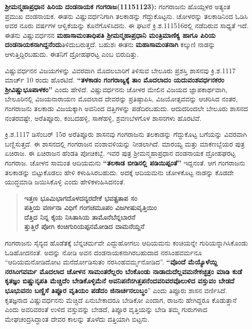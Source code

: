 \textbf{ಶ‍್ರೀಮನ್ಮಹಾಪ್ರಧಾನ ಹಿರಿಯ ದಂಡನಾಯಕ ಗಂಗರಾಜ(1115\general{\enginline{-}}1123):} ಗಂಗರಾಜನು ಹೊಯ್ಸಳರ ಅತ್ಯಂತ ಪ್ರಮುಖ ದಂಡನಾಯಕ. ಈತನು ವಿಷ್ಣುವರ್ಧನಿಗಾಗಿ ತಲಕಾಡನ್ನು ಗೆದ್ದುಕೊಟ್ಟನು. ಚೋಳರನ್ನು ತಲಕಾಡಿನಿಂದ ಓಡಿಸಿ ಅವರ ನೂರು ವರ್ಷಗಳ ಆಳ್ವಿಕೆಯನ್ನು ಕೊನೆಗೊಳಿಸಿದನು. ಈ ಘಟನೆ ಕ್ರಿ.ಶ.1115\enginline{-}16ರಲ್ಲಿ ನಡೆದಿರುವ ಸಾಧ್ಯತೆ ಇದೆ. ಈತನು ವಿಷ್ಣುವರ್ಧನನ \textbf{ಮಹಾಸಾಮಂತಾಧಿಪತಿ ಶ‍್ರೀಮನ್ಮಹಾಪ್ರಧಾನಿ ಮಂತ್ರಿಮಾಣಿಕ್ಯ ಹಾಗೂ ಪಿರಿಯ ದಂಡನಾಯಕನಾಗಿದ್ದನೆಂದು}ತಿಳಿದುಬರುತ್ತದೆ. ಬಹುಶಃ ಈತನು \textbf{ಮಹಾಸಾಮಂತನಾಗಿ} ಕಲ್ಕುಣಿ ನಾಡನ್ನು ಆಳುತ್ತಿದ್ದಿರ\-ಬಹುದು. ಈತನಿಗೆ ದ್ರೋಹಘರಟ್ಟ ಎಂಬ ಬಿರುದಿತ್ತು.

ವಿಷ್ಣುವರ್ಧನನ ವಿಜಯಗಳನ್ನು ವಿವರವಾಗಿ ಮೊದಲಬಾರಿಗೆ ತಿಳಿಸುವ ಬೇಲೂರು ಪ್ರಶಸ್ತಿ ಶಾಸನವು ಕ್ರಿ.ಶ.1117 ಮಾರ್ಚ್ 10 ರಂದು ಹೊರಟಿದೆ. \textbf{“ತಳಕಾಡಂ ಗಂಗರಾಜ್ಯಕ್ಕೆ ತಾಂ ಮೊದಲಾದಂ ಯದುವಂಶವರ್ಧನಕರಂ ಶ‍್ರೀವಿಷ್ಣು\-ಭೂಪಾಳಕಂ” }ಎಂದು ಹೇಳಿದೆ. ವಿಷ್ಣುವರ್ಧನನು ಚೋಳರ ಮೇಲಿನ ವಿಜಯದ ಜ್ಞಾಪಕಾರ್ಥವಾಗಿ, ಬೇಲೂರಿನಲ್ಲಿ ವಿಜಯನಾರಾಯಣ ಮೊದಲಾದ ದೇವರನ್ನು ಪ್ರತಿಷ್ಠಾಪಿಸಿ, ವಿಜಯೋತ್ಸವವನ್ನು ಆಚರಿಸಿದ ನಂತರ, ಗಂಗರಾಜನು ತಲಕಾಡು ವಿಜಯಕ್ಕಾಗಿ ಅವನಿಂದ ದತ್ತಿಗಳನ್ನು ಪಡೆದಿರಬಹುದು. ಆದುದರಿಂದಲೇ ಬೇಲೂರು ಶಾಸನದ ನಂತರವಷ್ಟೇ, ಅರೆತಿಪ್ಪೂರು, ಕಂಬದಹಳ್ಳಿ, ಸಾಣೆಹಳ್ಳಿ, ಶ್ರವಣಬೆಳಗೊಳ ಶಾಸನಗಳು ಹೊರಟಿವೆ.

ಕ್ರಿ.ಶ.1117 ಡಿಸೆಂಬರ್​ 15ರ ಅರೆತಿಪ್ಪೂರು ಶಾಸನವು ಗಂಗರಾಜನು ತಲಕಾಡನ್ನು ಗೆದ್ದುಕೊಟ್ಟ ಬಗೆಯನ್ನು ವಿವರವಾಗಿ ಬಣ್ಣಿಸುತ್ತದೆ. ಈ ಶಾಸನದಲ್ಲಿ ಗಂಗರಾಜನ ವಂಶಾವಳಿಯನ್ನು ನೀಡಲಾಗಿದೆ. ಮಾರಯ್ಯ ಮತ್ತು ಮಾಕಣಬ್ಬೆಯರ ಪುತ್ರ ಏಚಿರಾಜ. ಈ ಏಚಿರಾಜನ ಹೆಂಡತಿ ಪೋಚಿಕಬ್ಬೆ. ಇವರ ಪುತ್ರ ಶ‍್ರೀಮನ್ಮಹಾಪ್ರಧಾನ ದಂಡನಾಯಕ ದ್ರೋಹಘರಟ್ಟ ಗಂಗರಾಜ. ಚೋಳನ ಸಾಮಂತ ಆದಿಯಮನು \textbf{“ತಲಕಾಡ ಬೀಡಿನಲ್ಲಿ ಪಡಿಯಿಪ್ಪಂತೆ”} ಇದ್ದನಂತೆ. ಆಗ ಗಂಗರಾಜನು ತಲಕಾಡನ್ನು ಬಿಟ್ಟುಕೊಡಲು ಹೇಳಿ ಕಳುಹಿಸಿರಬಹುದು. ಅದಕ್ಕೆ ಆದಿಯಮನು ಚೋಳಕೊಟ್ಟ ನಾಡನ್ನು ಕೊಡದೇ ಯುದ್ಧಮಾಡಿ ಜಯಿಸಿಕೊಳ್ಳಿ ಎಂದು ಹೇಳಿಕಳುಹಿಸಿದನಂತೆ.

\begin{verse}
\textbf{ಇತ್ತಣ ಭೂಮಿಭಾಗದೊಳದನ್ಯರದೇಕೆ ಭವತ್ಪ್ರತಾಪ ಸಂ} \\\textbf{ಪತ್ತಿಯ ವರ್ಣನಾ ವಿಧಿಗೆ ಗಂಗಚಮೂಪಂ ವಿಜಗೀಷುವೃತ್ತಿಯಿಂ} \\\textbf{ದೆತ್ತಿದ ನಿನ್ನ ಕೈಯ ನಿಸಿತಾಸಿಯ ತಾಮೊನೆಬೆನ್ನಬಾರನೆ} \\\textbf{ತ್ತುತ್ತಿರೆ ಪೋಗಿ ಕಂಚಿಗುರಿಯಪ್ಪನಮೋಡಿದ ದಾಮನೆಯ್ದನೆ}
\end{verse}

ಗಂಗರಾಜನು ಸೈನ್ಯದ ಹೊಡೆತಕ್ಕೆ ಬೆನ್ನಚರ್ಮವೇ ಎದ್ದುಹೋಗಲು ಆದಿಯಮನು ಕಂಚಿಯನ್ನೇ ಗುರಿಯನ್ನಾಗಿಸಿ\-ಕೊಂಡು ಓಡಿಹೋದನಂತೆ. ಅದನ್ನು ನೋಡಿ ಅವನ ದಂಡನಾಯಕನಾಗಿರಬಹುದಾದ ನರಸಿಂಹವರ್ಮನೂ “ಆದಿಯಮ\-ನೋಡಿದೋಟ ಮನೆರ್ದೋಡಿಸುತಂ ನರಸಿಂಹವರ್ಮ್ಮನೋಡಿದ”. \textbf{“ವೊಂದೆ ಮೆಯ್ಯೊಳೆಯ್ದಿ ನರಸಿಂಗವರ್ಮ ಮೊದಲಾದ ಚೋಳನ ಸಾಮಂತರೆಲ್ಲರಂ ಬೆಂಕೊಂಡು ನಾಡಾದುದೆಲ್ಲವಮನೇಕಚ್ಛತ್ರಂ ಮಾಡಿ ಕುಡೆ ಕೃತಜ್ಞಂ ಬಿಷ್ಣುನೃಪತಿ ಮೆಚ್ಚಿದೆಂ ಬೇಡಿಕೊಳ್ಳಿಮೆನೆ ಅವನಿಪನೆನಗಿತ್ತಪನೆಂದವರಿವರವೊಲುಳಿದ ವಸ್ತುವಂ ಬೇಡದೆ ಭೂಭುವನಂ ಬಣ್ಣಿಸೆ ತಿಪ್ಪೂರ ವೃತಿಯಂ ಪಡೆದಂ\general{\break } ಜಿನಾರ್ಚನಲುಬ್ಧಂ}” ಎಂದು ತಿಪ್ಪೂರು ಶಾಸನ ವರ್ಣಿಸಿದೆ. ಕೃತಜ್ಞನಾದ ವಿಷ್ಣುವರ್ಧನನು ಮೆಚ್ಚಿದೆ ಏನುಬೇಕಾದರೂ ಬೇಡಿಕೋ ಎಂದಾಗ, ರಾಜನು ಹೇಗಿದ್ದರೂ ಕೊಡುತ್ತಾನೆ ಎಂದು ಅವರಿವರಂತೆ ಉಳಿದ ವಸ್ತುವನ್ನು ಬೇಡದೆ, ತಿಪ್ಪೂರ ವೃತ್ತಿಯನ್ನು ಬೇಡಿ ತಮ್ಮ ಗುರುಗಳಾದ ಮೇಘಚಂದ್ರಸಿದ್ಧಾಂತ ದೇವರ ಕಾಲನ್ನು ತೊಳೆದು ದತ್ತಿಯಾಗಿ ಬಿಟ್ಟನು.

